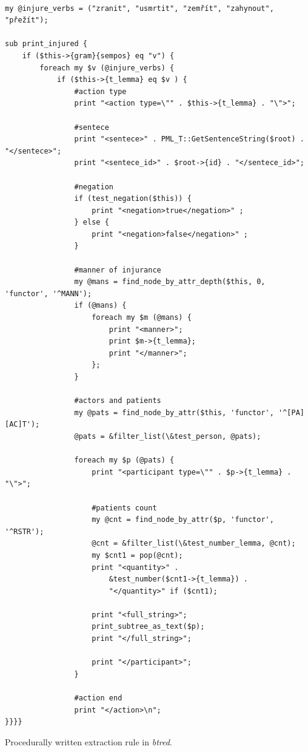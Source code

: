 \begin{listing}[ht]
\begin{verbatim}

my @injure_verbs = ("zranit", "usmrtit", "zemřít", "zahynout", "přežít");

sub print_injured {
	if ($this->{gram}{sempos} eq "v") {
		foreach my $v (@injure_verbs) {
			if ($this->{t_lemma} eq $v ) {
				#action type
				print "<action type=\"" . $this->{t_lemma} . "\">";

				#sentece
				print "<sentece>" . PML_T::GetSentenceString($root) . "</sentece>";
				print "<sentece_id>" . $root->{id} . "</sentece_id>";
				
				#negation
				if (test_negation($this)) {
					print "<negation>true</negation>" ;					
				} else {
					print "<negation>false</negation>" ;										
				}
								
				#manner of injurance
				my @mans = find_node_by_attr_depth($this, 0, 'functor', '^MANN');
				if (@mans) {
					foreach my $m (@mans) {
						print "<manner>"; 
						print $m->{t_lemma};
						print "</manner>"; 
					};
				}
				
				#actors and patients
				my @pats = find_node_by_attr($this, 'functor', '^[PA][AC]T');
				@pats = &filter_list(\&test_person, @pats);
				
				foreach my $p (@pats) {
					print "<participant type=\"" . $p->{t_lemma} . "\">";

					#patients count
					my @cnt = find_node_by_attr($p, 'functor', '^RSTR');
					@cnt = &filter_list(\&test_number_lemma, @cnt);
					my $cnt1 = pop(@cnt);
					print "<quantity>" . 
						&test_number($cnt1->{t_lemma}) . 
						"</quantity>" if ($cnt1);
	
					print "<full_string>";
					print_subtree_as_text($p);
					print "</full_string>";

					print "</participant>";
				}
				
				#action end
				print "</action>\n";											
}}}}
\end{verbatim}
\caption{Procedurally written extraction rule in \emph{btred}.}
\label{lst:btred_rule}
\end{listing}



